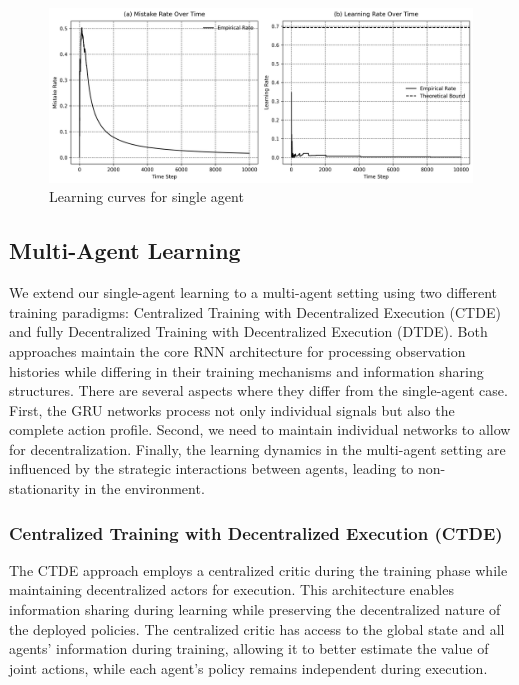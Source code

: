 \begin{figure}[htbp]
    \centering
    \includegraphics[width=1\textwidth]{../charts/single_agent_learning_curves_q=0.75.png}
    \caption{Learning curves for single agent}
    \label{fig:single-learning-curves}
\end{figure}

\subsection*{Multi-Agent Learning}

We extend our single-agent learning to a multi-agent setting using two different training paradigms: Centralized Training with Decentralized Execution (CTDE) and fully Decentralized Training with Decentralized Execution (DTDE). Both approaches maintain the core RNN architecture for processing observation histories while differing in their training mechanisms and information sharing structures. There are several aspects where they differ from the single-agent case. First, the GRU networks process not only individual signals but also the complete action profile. Second, we need to maintain individual networks to allow for decentralization. Finally, the learning dynamics in the multi-agent setting are influenced by the strategic interactions between agents, leading to non-stationarity in the environment.

\subsubsection*{Centralized Training with Decentralized Execution (CTDE)}

The CTDE approach employs a centralized critic during the training phase while maintaining decentralized actors for execution. This architecture enables information sharing during learning while preserving the decentralized nature of the deployed policies. The centralized critic has access to the global state and all agents' information during training, allowing it to better estimate the value of joint actions, while each agent's policy remains independent during execution.

